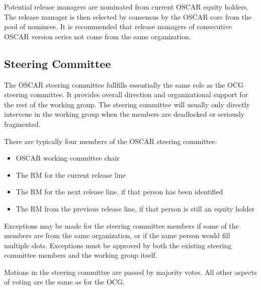 Potential release managers are nominated from current OSCAR equity
holders.  The release manager is then selected by consensus by the
OSCAR core from the pool of nominees.  It is recommended that release
managers of consecutive OSCAR version series not come from the same
organization.


\subsection{Steering Committee}

The OSCAR steering committee fullfills essentially the same role as
the OCG steering committee.  It provides overall direction and
organizational support for the rest of the working group.  The
steering committee will usually only directly intervene in the working
group when the members are deadlocked or seriously fragmented. 

There are typically four members of the OSCAR steering committee:

\begin{itemize}
\item OSCAR working committee chair
\item The RM for the current release line
\item The RM for the next release line, if that person has been
  identified
\item The RM from the previous release line, if that person is still
  an equity holder
\end{itemize}

Exceptions may be made for the steering committee members if some of
the members are from the same organization, or if the same person
would fill multiple slots.  Exceptions must be approved by both the
existing steering committee members and the working group itself.

Motions in the steering committee are passed by majority votes.  All
other aspects of voting are the same as for the OCG.

